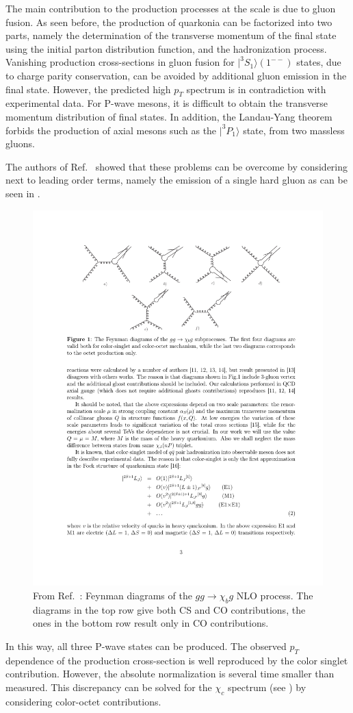 The main contribution to the production processes at the \tev scale is due to
gluon fusion. As seen before, the production of quarkonia can be factorized
into two parts, namely the determination of the transverse momentum of the
final state using the initial parton distribution function, and the
hadronization process. Vanishing production cross-sections in gluon fusion for
$|^3 S_1\rangle (1^{--})$ states, due to charge parity conservation, can be avoided
by additional gluon emission in the final state. However, the predicted high
$p_T$ spectrum is in contradiction with experimental data. For P-wave mesons,
it is difficult to obtain the transverse momentum distribution of final states.
In addition, the Landau-Yang theorem forbids the production of axial mesons
such as the $|^3P_1\rangle$ state, from two massless gluons.

The authors of Ref.~\cite{Likhoded:2012hw} showed that these problems can be overcome
by considering next to leading order terms, namely the emission of a single
hard gluon as can be seen in .
\begin{figure}
\center
\includegraphics[width=.75\textwidth]{figs/review/chibprod_fig1}
\caption{From Ref.~\cite{Likhoded:2012hw}: Feynman diagrams of the $gg\rightarrow \chi_b g$ NLO 
process. The diagrams in the top row give both CS and CO contributions, the ones in the 
bottom row result only in CO contributions.}
\label{fig:chibprod_fig1} 
\end{figure} 
In this way, all three P-wave states can be produced. 
The observed $p_T$ dependence of the production cross-section is well reproduced by 
the color singlet contribution. However, the absolute normalization is several time smaller 
than measured. This discrepancy can be solved for the $\chi_c$ spectrum (see )
by considering color-octet contributions.

